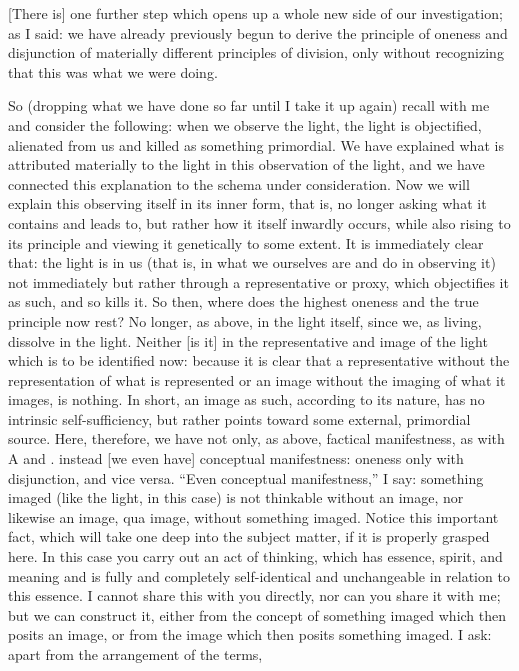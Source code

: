 [There is] one further step which opens up
a whole new side of our investigation;
as I said: we have already previously begun to
derive the principle of oneness and disjunction of
materially different principles of division,
only without recognizing that this was what we were doing.

So (dropping what we have done so far until I take it up again)
recall with me and consider the following:
when we observe the light, the light is objectified,
alienated from us and killed as something primordial.
We have explained what is attributed materially to
the light in this observation of the light,
and we have connected this explanation to
the schema under consideration.
Now we will explain this observing itself
in its inner form, that is,
no longer asking what it contains and leads to,
but rather how it itself inwardly occurs,
while also rising to its principle
and viewing it genetically to some extent.
It is immediately clear that:
the light is in us
(that is, in what we ourselves are and do in observing it)
not immediately but rather through a representative or proxy,
which objectifies it as such, and so kills it.
So then, where does the highest oneness and
the true principle now rest?
No longer, as above, in the light itself,
since we, as living, dissolve in the light.
Neither [is it] in the representative and image
of the light which is to be identified now:
because it is clear that a representative
without the representation of what is represented
or an image without the imaging of what it images,
is nothing.
In short, an image as such,
according to its nature,
has no intrinsic self-sufficiency,
but rather points toward some external, primordial source.
Here, therefore, we have not only, as above,
factical manifestness, as with A and .
instead [we even have] conceptual manifestness:
oneness only with disjunction, and vice versa.
“Even conceptual manifestness,” I say:
something imaged (like the light, in this case)
is not thinkable without an image,
nor likewise an image, qua image,
without something imaged.
Notice this important fact,
which will take one deep into the subject matter,
if it is properly grasped here.
In this case you carry out an act of thinking,
which has essence, spirit, and meaning
and is fully and completely self-identical
and unchangeable in relation to this essence.
I cannot share this with you directly,
nor can you share it with me;
but we can construct it,
either from the concept of something imaged
which then posits an image,
or from the image which then posits something imaged.
I ask: apart from the arrangement of the terms,
